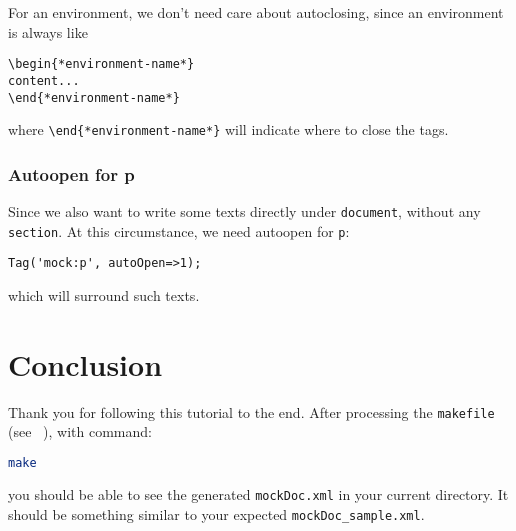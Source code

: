\documentclass[a4paper]{article}
\begin{document}
 For an environment, we don't need care about autoclosing, since an environment is always like
\begin{lstlisting}
\begin{*environment-name*}
content...
\end{*environment-name*}
\end{lstlisting}
where \texttt{\textbackslash end\{*environment-name*\}} will indicate where to close the tags.\\

\subsubsection{Autoopen for p}
Since we also want to write some texts directly under \texttt{document}, without any \texttt{section}. At this circumstance, we need autoopen for \texttt{p}:
\begin{lstlisting}
Tag('mock:p', autoOpen=>1);
\end{lstlisting}
which will surround such texts.\\

\section{Conclusion}
Thank you for following this tutorial to the end. After processing the \texttt{makefile}
(see ~\cite{app:mk}), with command:
\begin{lstlisting}[language=bash]
make
\end{lstlisting}
you should be able to see the generated \texttt{mockDoc.xml} in your current directory. It
should be something similar to your expected \texttt{mockDoc\_sample.xml}. 



\end{document}
